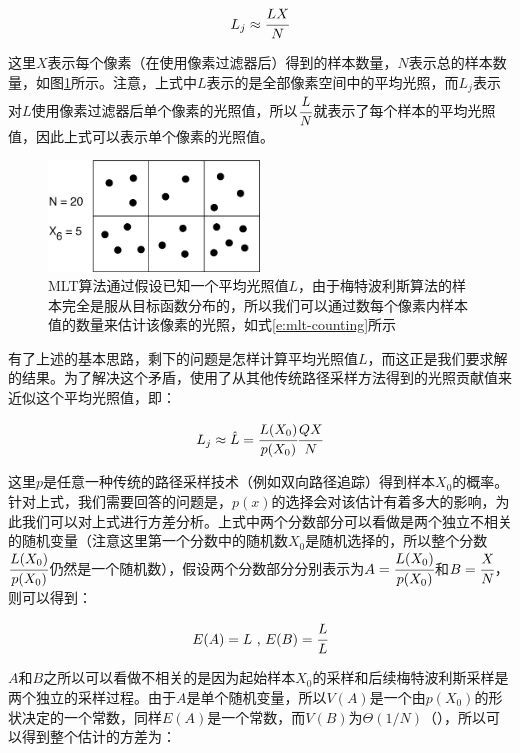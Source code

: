 \begin{equation}\label{e:mlt-counting}
	L_j\approx \cfrac{{L}X}{N}
\end{equation}

\noindent 这里$X$表示每个像素（在使用像素过滤器后）得到的样本数量，$N$表示总的样本数量，如图\ref{f:mlt-mlt-counting}所示。注意，上式中${L}$表示的是全部像素空间中的平均光照，而$L_j$表示对$L$使用像素过滤器后单个像素的光照值，所以$ \cfrac{{L}}{N}$就表示了每个样本的平均光照值，因此上式可以表示单个像素的光照值。

\begin{figure}
	\sidecaption
	\includegraphics[width=0.5\textwidth]{figures/mlt/mlt-counting}
	\caption{MLT算法通过假设已知一个平均光照值${L}$，由于梅特波利斯算法的样本完全是服从目标函数分布的，所以我们可以通过数每个像素内样本值的数量来估计该像素的光照，如式\ref{e:mlt-counting}所示}
	\label{f:mlt-mlt-counting}
\end{figure}

有了上述的基本思路，剩下的问题是怎样计算平均光照值${L}$，而这正是我们要求解的结果。为了解决这个矛盾，\cite{a:MetropolisLightTransport}使用了从其他传统路径采样方法得到的光照贡献值来近似这个平均光照值，即：

\begin{equation}\label{e:mlt-unbiased}
	L_j\approx\hat{L}= \cfrac{L(X_0)}{p(X_0)} \cfrac{QX}{N}
\end{equation}

这里$p$是任意一种传统的路径采样技术（例如双向路径追踪）得到样本$X_0$的概率。针对上式，我们需要回答的问题是，$p(x)$的选择会对该估计有着多大的影响，为此我们可以对上式进行方差分析。上式中两个分数部分可以看做是两个独立不相关的随机变量（注意这里第一个分数中的随机数$X_0$是随机选择的，所以整个分数$ \cfrac{L(X_0)}{p(X_0)}$仍然是一个随机数），假设两个分数部分分别表示为$A= \cfrac{L(X_0)}{p(X_0)}$和$B= \cfrac{X}{N}$，则可以得到：

\begin{equation}
	E(A)={L}\text{ , }
	E(B)= \cfrac{L}{{L}}
\end{equation}

$A$和$B$之所以可以看做不相关的是因为起始样本$X_0$的采样和后续梅特波利斯采样是两个独立的采样过程。由于$A$是单个随机变量，所以$V(A)$是一个由$p(X_0)$的形状决定的一个常数，同样$E(A)$是一个常数，而$V(B)$为$\Theta(1/N)$（\cite{a:AVarianceAnalysisoftheMetropolisLightTransportAlgorithm}），所以可以得到整个估计的方差为：

